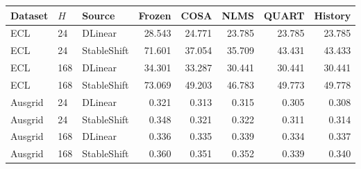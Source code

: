 \begin{tabular}{lllrrrrr}
\toprule
Dataset & $H$ & Source & Frozen & COSA & NLMS & QUART & History\\
\midrule
ECL & 24 & DLinear & 28.543 & 24.771 & 23.785 & 23.785 & 23.785\\
ECL & 24 & StableShift & 71.601 & 37.054 & 35.709 & 43.431 & 43.433\\
ECL & 168 & DLinear & 34.301 & 33.287 & 30.441 & 30.441 & 30.441\\
ECL & 168 & StableShift & 73.069 & 49.203 & 46.783 & 49.773 & 49.778\\
Ausgrid & 24 & DLinear & 0.321 & 0.313 & 0.315 & 0.305 & 0.308\\
Ausgrid & 24 & StableShift & 0.348 & 0.321 & 0.322 & 0.311 & 0.314\\
Ausgrid & 168 & DLinear & 0.336 & 0.335 & 0.339 & 0.334 & 0.337\\
Ausgrid & 168 & StableShift & 0.360 & 0.351 & 0.352 & 0.339 & 0.340\\
\bottomrule
\end{tabular}
